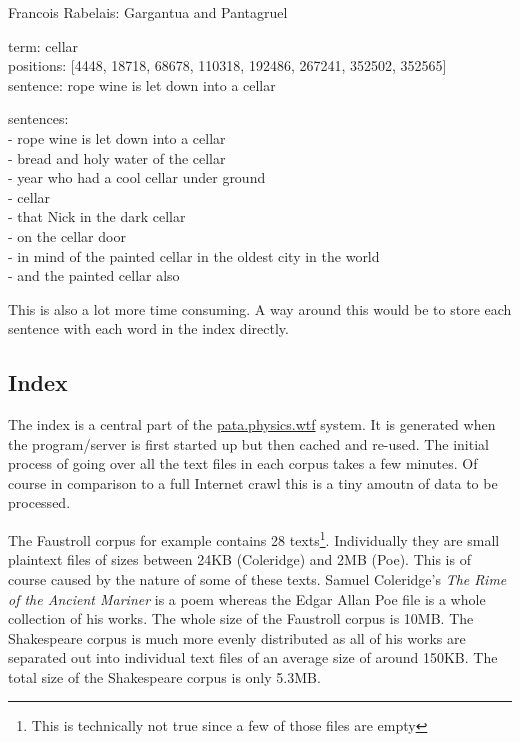 {Francois Rabelais: Gargantua and Pantagruel

term: cellar\\
positions: [4448, 18718, 68678, 110318, 192486, 267241, 352502, 352565]\\
sentence: rope wine is let down into a cellar

sentences: \\
  - rope wine is let down into a cellar\\
  - bread and holy water of the cellar\\
  - year who had a cool cellar under ground\\
  - cellar\\
  - that Nick in the dark cellar\\
  - on the cellar door\\
  - in mind of the painted cellar in the oldest city in the world\\
  - and the painted cellar also

\begin{draft}
  This is also a lot more time consuming.
  A way around this would be to store each sentence with each word in the index directly.
\end{draft}



\subsection{Index}
\label{s:index}

The index is a central part of the \url{pata.physics.wtf} system. It is generated when the program/server is first started up but then cached and re-used. The initial process of going over all the text files in each corpus takes a few minutes. Of course in comparison to a full Internet crawl this is a tiny amoutn of data to be processed. 

The Faustroll corpus for example contains 28 texts\footnote{This is technically not true since a few of those files are empty}. Individually they are small plaintext files of sizes between 24KB (Coleridge) and 2MB (Poe). This is of course caused by the nature of some of these texts. Samuel Coleridge's \textit{The Rime of the Ancient Mariner} is a poem whereas the Edgar Allan Poe file is a whole collection of his works. The whole size of the Faustroll corpus is 10MB. The Shakespeare corpus is much more evenly distributed as all of his works are separated out into individual text files of an average size of around 150KB. The total size of the Shakespeare corpus is only 5.3MB.

}
